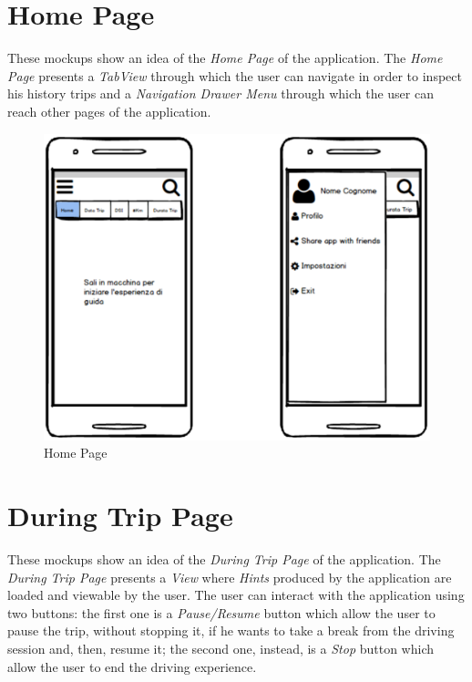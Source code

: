 \clearpage
\section{Home Page}
These mockups show an idea of the \textit{Home Page} of the application. The \textit{Home Page} presents a \textit{TabView} through which the user can navigate in order to inspect his history trips and a \textit{Navigation Drawer Menu} through which the user can reach other pages of the application.\\

\begin{figure}[htbp]
\centering
\includegraphics[width=\textwidth]{cpt/img/HomePage.png}
\caption{Home Page}
\end{figure}

\clearpage
\section{During Trip Page}
These mockups show an idea of the \textit{During Trip Page} of the application. The \textit{During Trip Page} presents a \textit{View} where \textit{Hints} produced by the application are loaded and viewable by the user. The user can interact with the application using two buttons: the first one is a \textit{Pause/Resume} button which allow the user to pause the trip, without stopping it, if he wants to take a break from the driving session and, then, resume it; the second one, instead, is a \textit{Stop} button which allow the user to end the driving experience.\\

